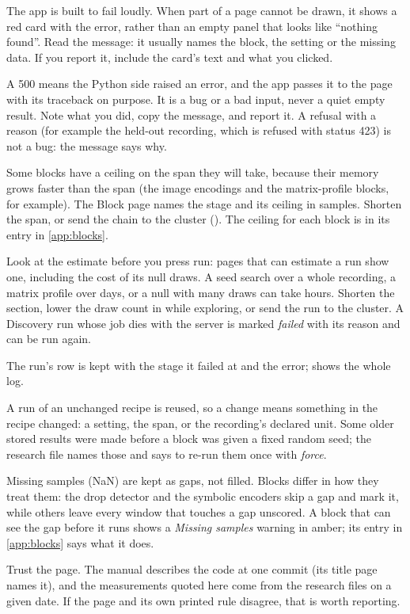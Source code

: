 The app is built to fail loudly. When part of a page cannot be drawn, it shows a red card with
the error, rather than an empty panel that looks like ``nothing found''. Read the message: it
usually names the block, the setting or the missing data. If you report it, include the
card's text and what you clicked.

A 500 means the Python side raised an error, and the app passes it to the page with its
traceback on purpose. It is a bug or a bad input, never a quiet empty result. Note what you
did, copy the message, and report it. A refusal with a reason (for example the held-out
recording, which is refused with status 423) is not a bug: the message says why.

Some blocks have a ceiling on the span they will take, because their memory grows faster than
the span (the image encodings and the matrix-profile blocks, for example). The Block page
names the stage and its ceiling in samples. Shorten the span, or send the chain to the
cluster (). The ceiling for each block is in its entry in
\cref{app:blocks}.

Look at the estimate before you press run: pages that can estimate a run show one, including
the cost of its null draws. A seed search over a whole recording, a matrix profile over days,
or a null with many draws can take hours. Shorten the section, lower the draw count in
 while exploring, or send the run to the cluster. A Discovery run whose job dies
with the server is marked \emph{failed} with its reason and can be run again.

The run's row is kept with the stage it failed at and the error;  shows the
whole log. 

A run of an unchanged recipe is reused, so a change means something in the recipe changed: a
setting, the span, or the recording's declared unit. Some older stored results were made
before a block was given a fixed random seed; the research file names those and says to re-run
them once with \emph{force}.

Missing samples (NaN) are kept as gaps, not filled. Blocks differ in how they treat them: the
drop detector and the symbolic encoders skip a gap and mark it, while others leave every
window that touches a gap unscored. A block that can see the gap before it runs shows a
\emph{Missing samples} warning in amber; its entry in \cref{app:blocks} says what it does.

Trust the page. The manual describes the code at one commit (its title page names it), and
the measurements quoted here come from the research files on a given date. If the page and
its own printed rule disagree, that is worth reporting.
